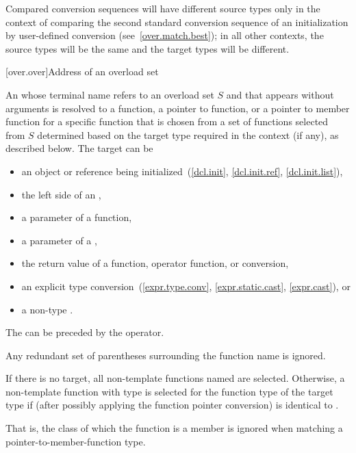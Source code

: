 \begin{itemize}
\begin{note}
Compared conversion sequences will have different source types only in the
context of comparing the second standard conversion sequence of an
initialization by user-defined conversion (see~\ref{over.match.best}); in
all other contexts, the source types will be the same and the target
types will be different.
\end{note}
\end{itemize}%
%

[over.over]{Address of an overload set}%
%

\pnum
An 
whose terminal name refers to an overload set $S$ and
that appears without arguments
is resolved to
a function,
a pointer to function, or
a pointer to member function
for a specific function
that is chosen from a set of functions selected from $S$
determined based on the target type required in the context (if any),
as described below.
The target can be
\begin{itemize}
\item
an object or reference being initialized~(\ref{dcl.init}, \ref{dcl.init.ref},
\ref{dcl.init.list}),
\item
the left side of an ,
\item
a parameter of a function,
\item
a parameter of a ,
\item
the return value of a function, operator function, or conversion,
\item
an explicit type conversion~(\ref{expr.type.conv}, \ref{expr.static.cast},
\ref{expr.cast}), or
\item
a non-type
.
\end{itemize}
The  can be preceded by the \tcode{\&} operator.
\begin{note}
Any redundant set of parentheses surrounding the function name is
ignored.
\end{note}

\pnum
If there is no target, all non-template functions named are selected.
Otherwise, a non-template function with type 
is selected for the function type  of the target type
if 
(after possibly applying the function pointer conversion)
is identical to .
\begin{note}
That is, the class of which the function is a member is ignored when matching a
pointer-to-member-function type.
\end{note}

